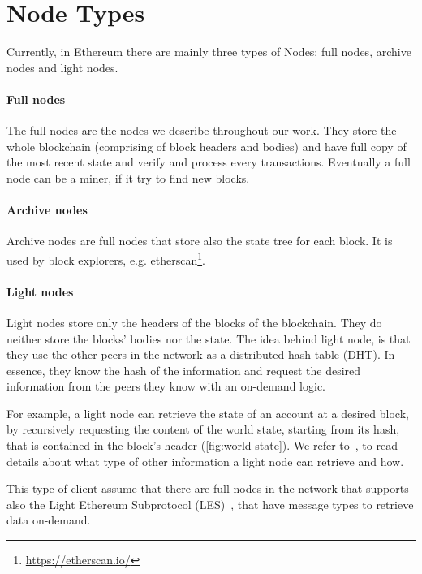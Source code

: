 \section{Node Types}
Currently, in Ethereum there are mainly three types of Nodes: full nodes,
archive nodes and light nodes.

\paragraph{Full nodes}
The full nodes are the nodes we describe throughout our work. They store the
whole blockchain (comprising of block headers and bodies) and have full
copy of the most recent state and verify and process every transactions. 
Eventually a full node can be a miner, if it try to find new blocks.

\paragraph{Archive nodes}
Archive nodes are full nodes that store also the state tree for each block. It
is used by block explorers, e.g.
etherscan\footnote{\url{https://etherscan.io/}}.

\paragraph{Light nodes}
Light nodes store only the headers of the blocks of the blockchain. They do
neither store the blocks' bodies nor the state. The idea behind light node,
is that they use the other peers in the network as a distributed hash table 
(DHT). In essence, they know the hash of the information and request the
desired information from the peers they know with an on-demand logic. 

For example, a light node can retrieve the state of an account at a 
desired block, by recursively requesting the content of the world state, 
starting from its hash, that is contained in the block's header
(\autoref{fig:world-state}). We refer to~\cite{bib:light-client}, to read 
details about what type of other information a light node can retrieve and how.

This type of client assume that there are full-nodes in the network that 
supports also the Light Ethereum Subprotocol (LES)~\cite{bib:les-protocol}, 
that have message types to retrieve data on-demand.